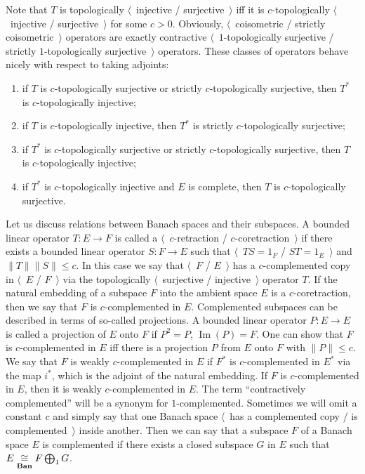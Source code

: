 Note that $T$ is topologically $\langle$~injective / surjective~$\rangle$ iff it
is $c$-topologically $\langle$~injective / surjective~$\rangle$ for some $c>0$.
Obviously, $\langle$~coisometric / strictly coisometric~$\rangle$ operators are
exactly contractive $\langle$~$1$-topologically surjective / strictly
$1$-topologically surjective~$\rangle$ operators. These classes of operators 
behave nicely with respect to taking adjoints:

\begin{enumerate}[label = (\roman*)]
  \item if $ T$ is $c$-topologically surjective or strictly $c$-topologically 
  surjective, then $ T^*$ is $c$-topologically injective;

  \item if $ T$ is $c$-topologically injective, then $ T^*$ is strictly
  $c$-topologically surjective;

  \item if $ T^*$ is $c$-topologically surjective or strictly $c$-topologically 
  surjective, then $ T$ is $c$-topologically injective;

  \item if $T^*$ is $c$-topologically injective and $E$ is complete, then $T$ 
  is $c$-topologically surjective.
\end{enumerate}

Let us discuss relations between Banach spaces and their subspaces. A bounded 
linear operator $T:E\to F$ is called a $\langle$~$c$-retraction /
$c$-coretraction~$\rangle$ if there exists a bounded linear operator $S:F\to E$
such that $\langle$~$T S=1_F$ / $S T=1_E$~$\rangle$ 
and $\lVert T\rVert\lVert S\rVert\leq c$. In this case we say 
that $\langle$~$F$ / $E$~$\rangle$ has a
$c$-complemented copy in $\langle$~$E$ / $F$~$\rangle$ via the topologically $\langle$~surjective /
injective~$\rangle$ operator $T$. If the natural embedding of a subspace $F$
into the ambient space $E$ is a $c$-coretraction, then we say that $F$ is
$c$-complemented in $E$. Complemented subspaces can be described in terms of so-called 
projections. A bounded linear operator $P:E\to E$ is called a projection 
of $E$ onto $F$ if $P^2=P$, $\operatorname{Im}(P)=F$. One can show that 
$F$ is $c$-complemented in $E$ iff there is a projection $P$ from $E$ onto $F$ 
with $\lVert P\rVert\leq c$. We say that $F$ is weakly $c$-complemented in $E$
if $F^*$ is $c$-complemented in $E^*$ via the map $i^*$, which is the adjoint of
the natural embedding. If $F$ is $c$-complemented in $E$, then it is 
weakly $c$-complemented in $E$.  The term ``contractively complemented'' will 
be a synonym for $1$-complemented. Sometimes we will omit a constant $c$ and 
simply say that one Banach space $\langle$~has a complemented copy / 
is complemented~$\rangle$ inside another. Then we can say that a 
subspace $F$ of a Banach space $E$ is complemented if there exists a 
closed subspace $G$ in $E$ such that $E\mathrel{\mathop{\cong}\limits_{\mathbf{Ban}}}F\bigoplus_1 G$.

